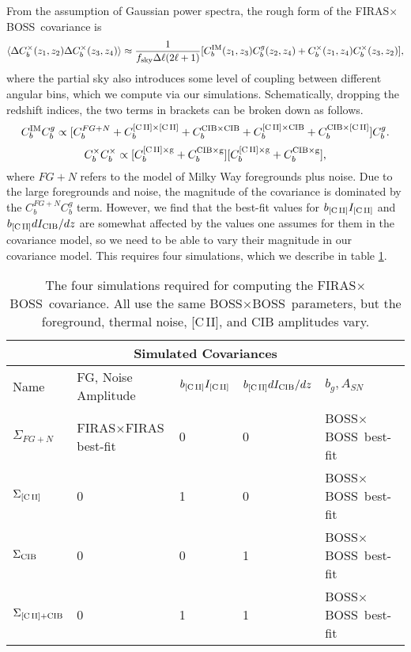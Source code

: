\documentclass[fleqn,usenatbib]{mnras}
\newcommand{\cii}{[C{\sc\,II}]}
\newcommand{\FF}{FIRAS${\times}$FIRAS}
\newcommand{\BB}{BOSS${\times}$BOSS}
\newcommand{\FB}{FIRAS${\times}$BOSS}
\begin{document}
From the assumption of Gaussian power spectra, the rough form of the \FB\, covariance is
\begin{equation}
\label{eq:gaussian_cross_variance}
    \langle \Delta C_b^{\times}(z_1,z_2) \Delta C_b^{\times}(z_3,z_4) \rangle \approx  \frac{1}{f_{\rm sky} \Delta \ell (2\ell + 1)} [ C_b^{\rm IM}(z_1,z_3) C_b^{g}(z_2,z_4) +
    C_b^{\times}(z_1,z_4) C_b^{\times}(z_3,z_2)],
\end{equation}
where the partial sky also introduces some level of coupling between different angular bins, which we compute via our simulations. Schematically, dropping the redshift indices, the two terms in brackets can be broken down as follows.
\begin{equation}
\label{eq:gaussian_cross_variance_expanded_auto_terms}
    C_b^{\rm IM}C_b^{g} \propto [ C_b^{FG+N} + C_b^{\rm \cii\times \cii} + C_b^{\rm CIB\times CIB} + C_b^{\rm \cii\times CIB} + C_b^{\rm CIB \times \cii}]C_b^{g}.
\end{equation}
\begin{equation}
\label{eq:gaussian_cross_variance_expanded_cross_terms}
    C_b^{\times}C_b^{\times} \propto [C_b^{\rm \cii\times g} + C_b^{\rm CIB \times g}][C_b^{\rm \cii\times g} + C_b^{\rm CIB \times g}],
\end{equation}
where $FG+N$ refers to the model of Milky Way foregrounds plus noise.
Due to the large foregrounds and noise, the magnitude of the covariance is dominated by the $C_b^{FG+N}C_b^{g}$ term. However, we find that the best-fit values for $b_{\rm \cii}I_{\rm \cii}$ and $b_{\rm \cii}dI_{\rm CIB}/dz$ are somewhat affected by the values one assumes for them in the covariance model, so we need to be able to vary their magnitude in our covariance model.  This requires four simulations, which we describe in table \ref{tab:sim_table}.

\begin{table}
	\centering
	\caption{The four simulations required for computing the \FB\ covariance. All use the same \BB\ parameters, but the foreground, thermal noise, \cii, and CIB amplitudes vary.}
	\label{tab:sim_table}
\begin{tabular}{ |p{2cm}||p{3.5cm}|p{2cm}|p{2cm}|p{3.5cm}|  }
 \hline
 \multicolumn{5}{|c|}{Simulated Covariances} \\
 \hline
 Name & FG, Noise Amplitude & $b_{\rm \cii}I_{\rm \cii}$ &$b_{\rm \cii}dI_{\rm CIB}/dz$ & $b_g, A_{SN}$ \\
 \hline
 $\Sigma_{FG+N}$ & \FF\, best-fit & 0 & 0 & \BB\, best-fit\\
 $\Sigma_{\rm \cii}$ & 0 & 1 & 0 & \BB\, best-fit\\
 $\Sigma_{\rm CIB}$ & 0 & 0 & 1 & \BB\, best-fit\\
 $\Sigma_{\rm \cii + CIB}$ & 0 & 1 & 1 & \BB\, best-fit\\
 \hline
\end{tabular}
\end{table}
\end{document}
